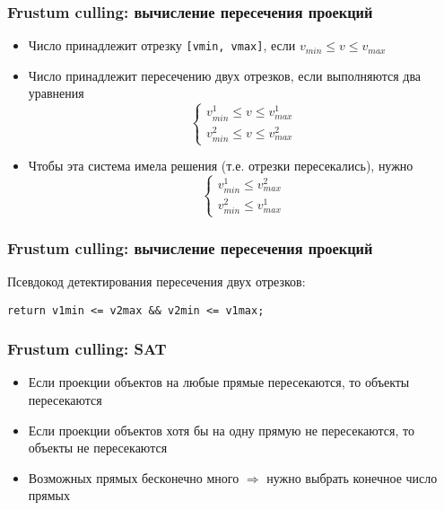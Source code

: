 \documentclass{beamer}
\begin{document}
\begin{frame}[fragile]
\fontsize{10pt}{10pt}
\frametitle{Frustum culling: вычисление пересечения проекций}
\begin{itemize}
\item Число принадлежит отрезку \verb|[vmin, vmax]|, если \begin{math}v_{min} \leq v \leq v_{max}\end{math}
\pause
\item Число принадлежит пересечению двух отрезков, если выполняются два уравнения
\begin{equation}
\begin{cases}
v^1_{min} \leq v \leq v^1_{max} \\
v^2_{min} \leq v \leq v^2_{max}
\end{cases}
\end{equation}
\pause
\item Чтобы эта система имела решения (т.е. отрезки пересекались), нужно
\begin{equation}
\begin{cases}
v^1_{min} \leq v^2_{max} \\
v^2_{min} \leq v^1_{max}
\end{cases}
\end{equation}
\end{itemize}
\end{frame}

\begin{frame}[fragile]
\fontsize{10pt}{10pt}
\frametitle{Frustum culling: вычисление пересечения проекций}
Псевдокод детектирования пересечения двух отрезков:
\begin{verbatim}
return v1min <= v2max && v2min <= v1max;
\end{verbatim}
\end{frame}

\begin{frame}[fragile]
\frametitle{Frustum culling: SAT}
\begin{itemize}
\item Если проекции объектов на любые прямые пересекаются, то объекты пересекаются
\pause
\item Если проекции объектов хотя бы на одну прямую не пересекаются, то объекты не пересекаются
\pause
\item Возможных прямых бесконечно много \begin{math}\Rightarrow\end{math} нужно выбрать конечное число прямых
\end{itemize}
\end{frame}
\end{document}
